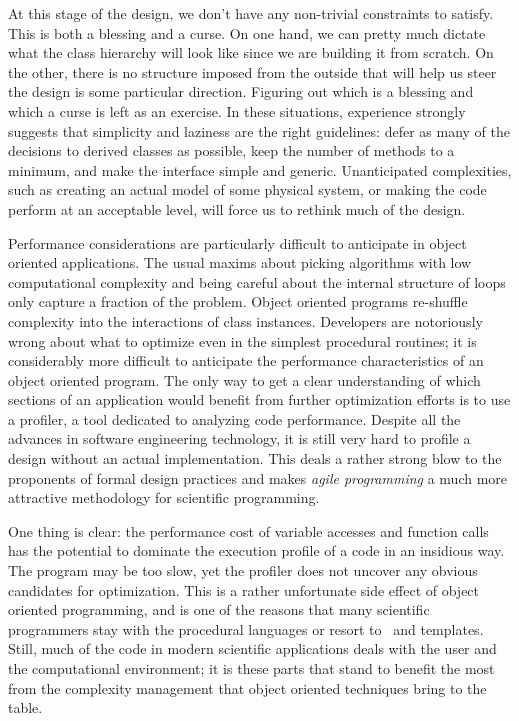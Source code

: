 At this stage of the design, we don't have any non-trivial constraints to satisfy. This is both
a blessing and a curse. On one hand, we can pretty much dictate what the class hierarchy will
look like since we are building it from scratch. On the other, there is no structure imposed
from the outside that will help us steer the design is some particular direction. Figuring out
which is a blessing and which a curse is left as an exercise. In these situations, experience
strongly suggests that simplicity and laziness are the right guidelines: defer as many of the
decisions to derived classes as possible, keep the number of methods to a minimum, and make the
interface simple and generic. Unanticipated complexities, such as creating an actual model of
some physical system, or making the code perform at an acceptable level, will force us to
rethink much of the design.

Performance considerations are particularly difficult to anticipate in object oriented
applications. The usual maxims about picking algorithms with low computational complexity and
being careful about the internal structure of loops only capture a fraction of the problem.
Object oriented programs re-shuffle complexity into the interactions of class instances.
Developers are notoriously wrong about what to optimize even in the simplest procedural
routines; it is considerably more difficult to anticipate the performance characteristics of an
object oriented program. The only way to get a clear understanding of which sections of an
application would benefit from further optimization efforts is to use a profiler, a tool
dedicated to analyzing code performance. Despite all the advances in software engineering
technology, it is still very hard to profile a design without an actual implementation. This
deals a rather strong blow to the proponents of formal design practices and makes {\em agile
programming}\supercite{agile} a much more attractive methodology for scientific programming.

One thing is clear: the performance cost of variable accesses and function calls has the
potential to dominate the execution profile of a code in an insidious way. The program may be
too slow, yet the profiler does not uncover any obvious candidates for optimization. This is a
rather unfortunate side effect of object oriented programming, and is one of the reasons that
many scientific programmers stay with the procedural languages or resort to \cpp\ and
templates. Still, much of the code in modern scientific applications deals with the user and
the computational environment; it is these parts that stand to benefit the most from the
complexity management that object oriented techniques bring to the table.

